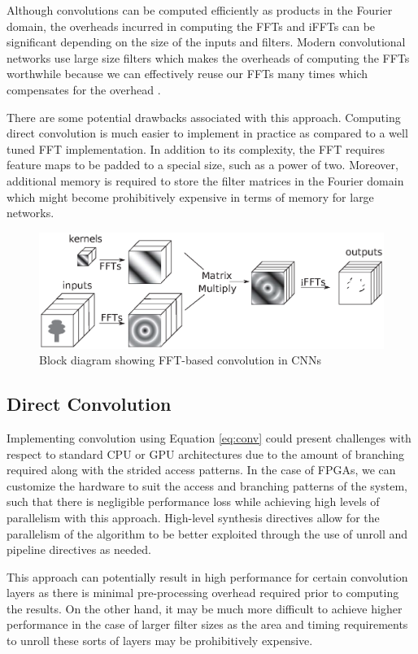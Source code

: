 \documentclass[conference,compsoc]{IEEEtran/IEEEtran}
\begin{document}
Although convolutions can be computed efficiently as products in the Fourier domain, the overheads incurred in computing the FFTs and iFFTs can be significant depending on the size of the inputs and filters. Modern convolutional networks use large size filters which makes the overheads of computing the FFTs worthwhile because we can effectively reuse our FFTs many times which compensates for the overhead \cite{FFT1}.

There are some potential drawbacks associated with this approach. Computing direct convolution is much easier to implement in practice as compared to a well tuned FFT implementation. In addition to its complexity, the FFT requires feature maps to be padded to a special size, such as a power of two. Moreover, additional memory is required to store the filter matrices in the Fourier domain which might become prohibitively expensive in terms of memory for large networks.
\begin{figure}[!h]
\begin{center}
\centering
\includegraphics[width=1\columnwidth]{CNN-FFT.eps}
\caption{Block diagram showing FFT-based convolution in CNNs}
\label{CNN-FFT}
\end{center}
\end{figure}
\subsection{Direct Convolution}
Implementing convolution using Equation \ref{eq:conv} could present challenges with respect to standard CPU or GPU architectures
due to the amount of branching required along with the strided access patterns. In the case of FPGAs, we can customize the hardware
to suit the access and branching patterns of the system, such that there is negligible performance loss while achieving high
levels of parallelism with this approach. High-level synthesis directives allow for the parallelism of the algorithm to be better
exploited through the use of unroll and pipeline directives as needed.

This approach can potentially result in high performance for certain convolution layers as there is minimal pre-processing overhead
required prior to computing the results. On the other hand, it may be much more difficult to achieve higher performance in the case of
larger filter sizes as the area and timing requirements to unroll these sorts of layers may be prohibitively expensive.
\end{document}
